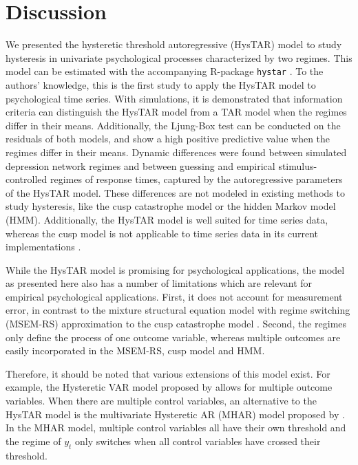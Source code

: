 \documentclass{article}
\begin{document}
\section{Discussion} \label{sec:discussion}
We presented the hysteretic threshold autoregressive (HysTAR) model \citep{bar1, bar2} to study hysteresis in univariate psychological processes characterized by two regimes.
This model can be estimated with the accompanying \textsf{R}-package \texttt{hystar} \citep{R, R_hystar}.
To the authors' knowledge, this is the first study to apply the HysTAR model to psychological time series.
With simulations, it is demonstrated that information criteria can distinguish the HysTAR model from a TAR model when the regimes differ in their means. Additionally, the Ljung-Box test can be conducted on the residuals of both models, and show a high positive predictive value when the regimes differ in their means.
Dynamic differences were found between simulated depression network regimes and between guessing and empirical stimulus-controlled regimes of response times, captured by the autoregressive parameters of the HysTAR model. These differences are not modeled in existing methods to study hysteresis, like the cusp catastrophe model or the hidden Markov model (HMM).
Additionally, the HysTAR model is well suited for time series data, whereas the cusp model is not applicable to time series data in its current implementations \citep{R_cusp, chow2014regime}.

While the HysTAR model is promising for psychological applications, the model as presented here also has a number of limitations which are relevant for empirical psychological applications. 
First, it does not account for measurement error, in contrast to the mixture structural equation model with regime switching (MSEM-RS) approximation to the cusp catastrophe model \citep{chow2014regime}.
Second, the regimes only define the process of one outcome variable, whereas multiple outcomes are easily incorporated in the MSEM-RS, cusp model and HMM.

Therefore, it should be noted that various extensions of this model exist. 
For example, the Hysteretic VAR model proposed by \citet{chen} allows for multiple outcome variables. 
When there are multiple control variables, an alternative to the HysTAR model is the multivariate Hysteretic AR (MHAR) model proposed by \citet{tsay}. 
In the MHAR model, multiple control variables all have their own threshold and the regime of $y_t$ only switches when all control variables have crossed their threshold. 
\end{document}

